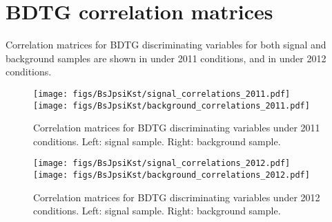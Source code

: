 \section{BDTG correlation matrices}\label{app:BsJpsiKst_selection_corr}
Correlation matrices for BDTG discriminating variables for both signal and background samples are shown in  under 2011 conditions, and in  under 2012 conditions.
%
\begin{figure}[h]
\begin{center}
\texttt{[image: figs/BsJpsiKst/signal\_correlations\_2011.pdf]}
\texttt{[image: figs/BsJpsiKst/background\_correlations\_2011.pdf]}
\caption{Correlation matrices for BDTG discriminating variables under 2011 conditions. Left: signal sample. Right: background sample.}
\label{fig:appCorr2011}
\end{center}
\end{figure}
%
\begin{figure}[h]
\begin{center}
\texttt{[image: figs/BsJpsiKst/signal\_correlations\_2012.pdf]}
\texttt{[image: figs/BsJpsiKst/background\_correlations\_2012.pdf]}
\caption{Correlation matrices for BDTG discriminating variables under 2012 conditions. Left: signal sample. Right: background sample.}
\label{fig:appCorr2012}
\end{center}
\end{figure}
%
\clearpage
